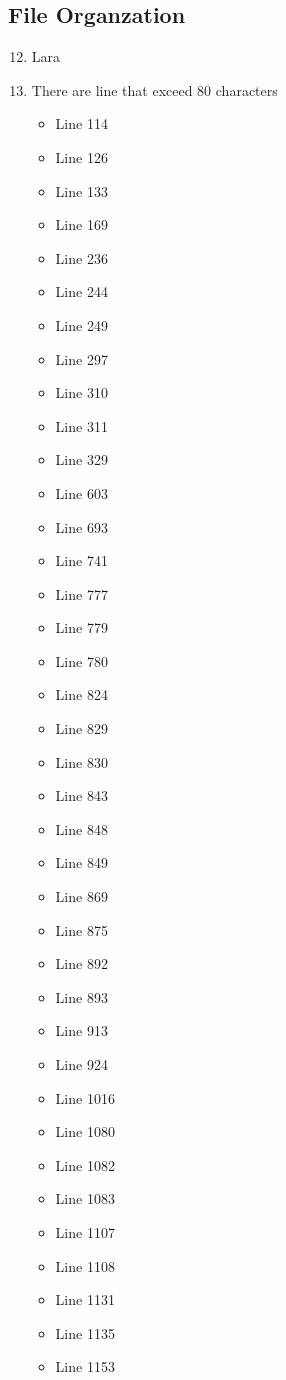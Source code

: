 \subsection{File Organzation}
\begin{enumerate}
	\setcounter{enumi}{11}
	\item Lara
	\item There are line that exceed 80 characters
	\begin{itemize}
		\item Line 114
		\item Line 126
		\item Line 133
		\item Line 169
		\item Line 236
		\item Line 244
		\item Line 249
		\item Line 297
		\item Line 310
		\item Line 311
		\item Line 329
		\item Line 603
		\item Line 693
		\item Line 741
		\item Line 777
		\item Line 779
		\item Line 780
		\item Line 824
		\item Line 829
		\item Line 830
		\item Line 843
		\item Line 848
		\item Line 849
		\item Line 869
		\item Line 875
		\item Line 892
		\item Line 893
		\item Line 913
		\item Line 924
		\item Line 1016
		\item Line 1080
		\item Line 1082
		\item Line 1083
		\item Line 1107
		\item Line 1108
		\item Line 1131
		\item Line 1135
		\item Line 1153

\end{itemize}
\end{enumerate}
